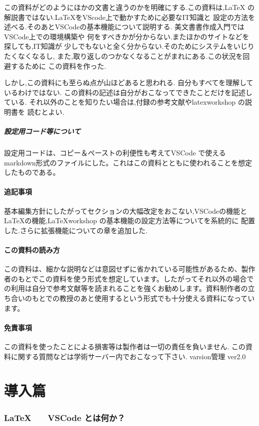 \documentclass{ltjsarticle}
\begin{document}
この資料がどのようにほかの文書と違うのかを明確にする.この資料は,\LaTeX
の解説書ではない.\LaTeX をVScode上で動かすために必要なIT知識と
設定の方法を述べる.そのあとVSCodeの基本機能について説明する.
美文書書作成入門\cite{美文書本}ではVSCode上での環境構築や
何をすべきかが分からない.またほかのサイトなどを探しても,IT知識が
少しでもないと全く分からない.そのためにシステムをいじりたくなくなるし,
また,取り返しのつかなくなることがまれにある.この状況を回避するために
この資料を作った.

しかし,この資料にも至らぬ点が山ほどあると思われる.
自分もすべてを理解しているわけではない.
この資料の記述は自分がおこなってできたことだけを記述している.
それ以外のことを知りたい場合は,付録の参考文献やlatexworkshop の説明書を
読むとよい.
\subsubsection{設定用コード等について}
設定用コードは、コピー＆ペーストの利便性も考えてVSCode で使えるmarkdown形式のファイルにした。これはこの資料とともに使われることを想定したものである。
\subsection{追記事項}
基本編集方針にしたがってセクションの大幅改定をおこない,VSCodeの機能と
LaTeXの機能,LaTeXworkshop の基本機能の設定方法等についてを系統的に
配置した.さらに拡張機能についての章を追加した.
\subsection{この資料の読み方}
この資料は、細かな説明などは意図せずに省かれている可能性があるため、製作者のもとでこの資料を使う形式を想定しています。したがってそれ以外の場合での利用は自分で参考文献等を読まれることを強くお勧めします。資料制作者の立ち合いのもとでの教授のあと使用するという形式でも十分使える資料になっています。
\subsection{免責事項}
この資料を使ったことによる損害等は製作者は一切の責任を負いません.
この資料に関する質問などは学術サーバー内でおこなって下さい.
varsion管理  ver2.0
\tableofcontents
\part{導入篇}
\section{\LaTeX　　VSCode とは何か？}
\end{document}
